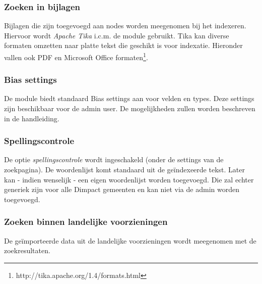 \subsubsection{Zoeken in bijlagen}
Bijlagen die zijn toegevoegd aan nodes worden meegenomen bij het indexeren. Hiervoor wordt \emph{Apache Tika} i.c.m. de  module gebruikt. Tika kan diverse formaten omzetten naar platte tekst die geschikt is voor indexatie. Hieronder vallen ook PDF en Microsoft Office formaten\footnote{http://tika.apache.org/1.4/formats.html}.

\subsubsection{Bias settings}
De  module biedt standaard Bias settings aan voor velden en types. Deze settings zijn beschikbaar voor de admin user. De mogelijkheden zullen worden beschreven in de handleiding.

\subsubsection{Spellingscontrole}
De optie \emph{spellingscontrole} wordt ingeschakeld (onder de settings van de zoekpagina). De woordenlijst komt standaard uit de ge\"{i}ndexeerde tekst. Later kan - indien wenselijk - een eigen woordenlijst worden toegevoegd. Die zal echter generiek zijn voor alle Dimpact gemeenten en kan niet via de admin worden toegevoegd.

\subsubsection{Zoeken binnen landelijke voorzieningen}
De ge\"{i}mporteerde data uit de landelijke voorzieningen wordt meegenomen met de zoekresultaten. 

